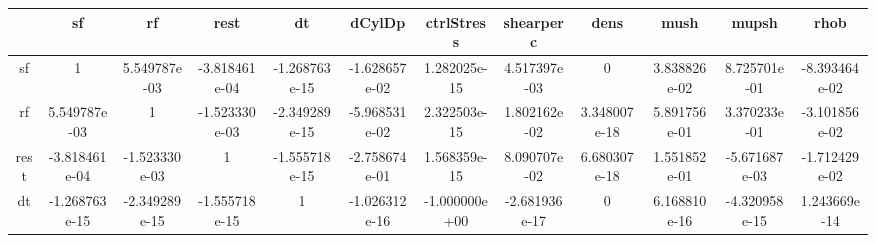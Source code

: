 \begin{table}[H!]                                                                                                                                                          
\centering                                                                                                                                                                 
\begin{tabular}{|c|c|c|c|c|c|c|c|c|c|c|c|}                                                                                                                                 
\hline                                                                                                                                                                     
 & sf & rf & rest & dt & dCylDp & ctrlStress & shearperc & dens & mush & mupsh & rhob \\                                                                                   
\hline                                                                                                                                                                     
sf & 1 & 5.549787e-03 & -3.818461e-04 & -1.268763e-15 & -1.628657e-02 & 1.282025e-15 & 4.517397e-03 & 0 & 3.838826e-02 & 8.725701e-01 & -8.393464e-02 \\                   
\hline                                                                                                                                                                     
rf & 5.549787e-03 & 1 & -1.523330e-03 & -2.349289e-15 & -5.968531e-02 & 2.322503e-15 & 1.802162e-02 & 3.348007e-18 & 5.891756e-01 & 3.370233e-01 & -3.101856e-02 \\        
\hline                                                                                                                                                                     
rest & -3.818461e-04 & -1.523330e-03 & 1 & -1.555718e-15 & -2.758674e-01 & 1.568359e-15 & 8.090707e-02 & 6.680307e-18 & 1.551852e-01 & -5.671687e-03 & -1.712429e-02 \\    
\hline                                                                                                                                                                     
dt & -1.268763e-15 & -2.349289e-15 & -1.555718e-15 & 1 & -1.026312e-16 & -1.000000e+00 & -2.681936e-17 & 0 & 6.168810e-16 & -4.320958e-15 & 1.243669e-14 \\                
\hline                                                                                                                                                                     

\end{tabular}
\end{table}
